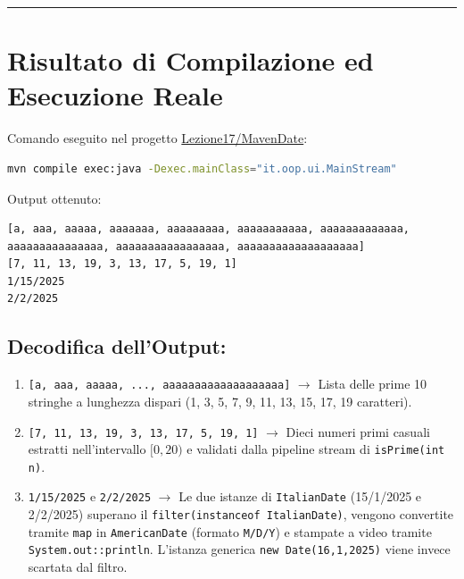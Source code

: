 \documentclass[11pt,a4paper,oneside]{report}
\newcommand{\passthrough}[1]{#1}
\providecommand{\tightlist}{\setlength{\itemsep}{0pt}\setlength{\parskip}{0pt}}
\begin{document}
\begin{center}\rule{0.5\linewidth}{0.5pt}\end{center}

\section{Risultato di Compilazione ed Esecuzione
Reale}\label{chap17_risultato-di-compilazione-ed-esecuzione-reale}

Comando eseguito nel progetto
\href{file:///home/wally/Documenti/GitHub/Programmazione-II/25-26/Teoria-e-Esercitazioni/Codice-20260902/Lezione17/MavenDate}{Lezione17/MavenDate}:

\begin{lstlisting}[language=bash]
mvn compile exec:java -Dexec.mainClass="it.oop.ui.MainStream"
\end{lstlisting}

Output ottenuto:

\begin{lstlisting}
[a, aaa, aaaaa, aaaaaaa, aaaaaaaaa, aaaaaaaaaaa, aaaaaaaaaaaaa, aaaaaaaaaaaaaaa, aaaaaaaaaaaaaaaaa, aaaaaaaaaaaaaaaaaaa]
[7, 11, 13, 19, 3, 13, 17, 5, 19, 1]
1/15/2025
2/2/2025
\end{lstlisting}

\subsection{Decodifica dell'Output:}\label{chap17_decodifica-delloutput}

\begin{enumerate}
\def\labelenumi{\arabic{enumi}.}
\tightlist
\item
  \passthrough{\lstinline![a, aaa, aaaaa, ..., aaaaaaaaaaaaaaaaaaa]!}
  \(\rightarrow\) Lista delle prime 10 stringhe a lunghezza dispari (1,
  3, 5, 7, 9, 11, 13, 15, 17, 19 caratteri).
\item
  \passthrough{\lstinline![7, 11, 13, 19, 3, 13, 17, 5, 19, 1]!}
  \(\rightarrow\) Dieci numeri primi casuali estratti nell'intervallo
  \([0, 20)\) e validati dalla pipeline stream di
  \passthrough{\lstinline!isPrime(int n)!}.
\item
  \passthrough{\lstinline!1/15/2025!} e
  \passthrough{\lstinline!2/2/2025!} \(\rightarrow\) Le due istanze di
  \passthrough{\lstinline!ItalianDate!} (15/1/2025 e 2/2/2025) superano
  il \passthrough{\lstinline!filter(instanceof ItalianDate)!}, vengono
  convertite tramite \passthrough{\lstinline!map!} in
  \passthrough{\lstinline!AmericanDate!} (formato
  \passthrough{\lstinline!M/D/Y!}) e stampate a video tramite
  \passthrough{\lstinline!System.out::println!}. L'istanza generica
  \passthrough{\lstinline!new Date(16,1,2025)!} viene invece scartata
  dal filtro.
\end{enumerate}
\end{document}
